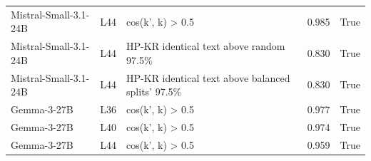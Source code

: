 \begin{table}
\begin{tabular}{lllrr}
Mistral-Small-3.1-24B & L44 & cos(k', k) > 0.5 & 0.985 & True \\
Mistral-Small-3.1-24B & L44 & HP-KR identical text above random 97.5\% & 0.830 & True \\
Mistral-Small-3.1-24B & L44 & HP-KR identical text above balanced splits' 97.5\% & 0.830 & True \\
Gemma-3-27B & L36 & cos(k', k) > 0.5 & 0.977 & True \\
Gemma-3-27B & L40 & cos(k', k) > 0.5 & 0.974 & True \\
Gemma-3-27B & L44 & cos(k', k) > 0.5 & 0.959 & True \\
\bottomrule
\end{tabular}
\end{table}
